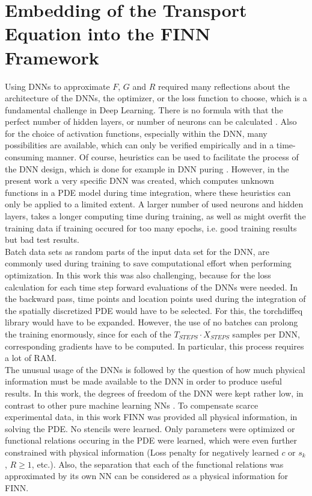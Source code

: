 \section{Embedding of the Transport Equation into the FINN Framework}
Using DNNs to approximate $F$, $G$ and $R$ required many reflections about the architecture of the DNNs, the optimizer, or the loss function to choose, which is a fundamental challenge in Deep Learning. There is no formula with that the perfect number of hidden layers, or number of neurons can be calculated \cite{Stathakis2009Apr}. Also for the choice of activation functions, especially within the DNN, many possibilities are available, which can only be verified empirically and in a time-consuming manner. Of course, heuristics can be used to facilitate the process of the DNN design, which is done for example in DNN puring \cite{Blalock2020Mar}. However, in the present work a very specific DNN was created, which computes unknown functions in a PDE model during time integration, where these heuristics can only be applied to a limited extent. A larger number of used neurons and hidden layers, takes a longer computing time during training, as well as might overfit the training data if training occured for too many epochs, i.e. good training results but bad test results.\\
Batch data sets as random parts of the input data set for the DNN, are commonly used during training to save computational effort when performing optimization. In this work this was also challenging, because for the loss calculation for each time step forward evaluations of the DNNs were needed. In the backward pass, time points and location points used during the integration of the spatially discretized PDE would have to be selected. For this, the torchdiffeq library \cite{torchdiffeq} would have to be expanded. However, the use of no batches can prolong the training enormously, since for each of the $T_{STEPS} \cdot X_{STEPS}$ samples per DNN, corresponding gradients have to be computed. In particular, this process requires a lot of RAM.\\
The unusual usage of the DNNs is followed by the question of how much physical information must be made available to the DNN in order to produce useful results. In this work, the degrees of freedom of the DNN were kept rather low, in contrast to other pure machine learning NNs \cite{Kalchbrenner2016Oct, Karlbauer2019Dec}. To compensate scarce experimental data, in this work FINN was provided all physical information, in solving the PDE. No stencils were learned. Only parameters were optimized or functional relations occuring in the PDE were learned, which were even further constrained with physical information (Loss penalty for negatively learned $c$ or $s_k$, $R \geq 1$, etc.). Also, the separation that each of the functional relations was approximated by its own NN can be considered as a physical information for FINN.\\
